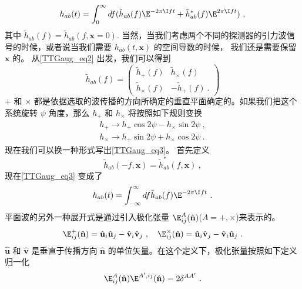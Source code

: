 \begin{equation}\label{TTGaug_eq3}
h_{ab} (t) = \int^\infty_0 df ( \tilde h_{ab} (f) \E^{-2\pi \I f t} + \tilde h^*_{ab} (f) \E^{2\pi \I f t} ) ~, 
\end{equation}
其中 $\tilde h_{ab}(f) = \tilde h_{ab}(f,\mathbf x = 0)$. 当然，当我们考虑两个不同的探测器的引力波信号的时候，或者说当我们需要 $h_{ab}(t,\mathbf x)$ 的空间导数的时候， 我们还是需要保留 $\mathbf x$ 的。 从\autoref{TTGaug_eq2} 出发，我们可以得到
\begin{equation}
\tilde h_{ab} (f) = 
\begin{pmatrix}
\tilde h_+(f) & \tilde h_{\times} (f) \\
\tilde h_{\times} (f) & -\tilde h_+ (f) ~.
\end{pmatrix}
\end{equation}
$+$ 和 $\times$ 都是依据选取的波传播的方向所确定的垂直平面确定的。如果我们把这个系统旋转 $\psi$ 角度，那么 $h_+$ 和 $h_{\times}$ 将按照如下规则变换
\begin{equation}
\begin{aligned}
h_+\rightarrow h_+ \cos 2 \psi - h_\times \sin 2 \psi ~, \\
h_\times \rightarrow h_+ \sin 2 \psi + h_\times \cos 2\psi ~.
\end{aligned}
\end{equation}
现在我们可以换一种形式写出\autoref{TTGaug_eq3}。 首先定义
\begin{equation}
\tilde h_{ab} (-f,\mathbf x) = \tilde h^*_{ab} (f,\mathbf x) ~,
\end{equation}
现在\autoref{TTGaug_eq3} 变成了
\begin{equation}
h_{ab} (t) = \int_{-\infty}^{\infty} df \tilde h_{ab} (f) \E^{-2\pi \I f t}~. 
\end{equation}
平面波的另外一种展开式是通过引入极化张量 $\E^A_{ij}(\hat{ {\mathbf n} })$($A = +,\times$)来表示的。 
\begin{equation}
\E^+_{ij} (\hat{ {\mathbf n} }) = \hat{{\mathbf u} }_i \hat{{\mathbf u} }_j - \hat{{\mathbf v} }_i \hat{{\mathbf v} }_j~, \quad \E^\times_{ij} (\hat{ {\mathbf n} }) = \hat{{\mathbf u} }_i \hat{{\mathbf v} }_j - \hat{{\mathbf v} }_i \hat{{\mathbf u} }_j ~.
\end{equation}
$\hat{ {\mathbf u} }$ 和 $\hat{ {\mathbf v} }$ 是垂直于传播方向 $\hat{  {\mathbf n}  }$ 的单位矢量。在这个定义下，极化张量按照如下定义归一化
\begin{equation}
\E^A_{ij}(\hat{ {\mathbf n} }) \E^{A',ij} (\hat{ {\mathbf n} }) = 2 \delta^{AA'} ~.  
\end{equation}
